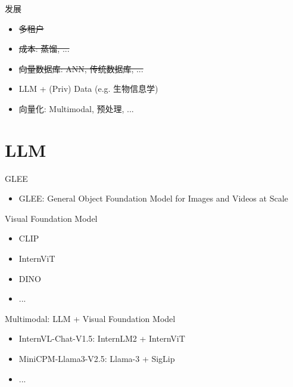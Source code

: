\documentclass{beamer}
\begin{document}
\begin{frame}{发展}
    \begin{itemize}
        \item \sout{多租户}
        \item \sout{成本: 蒸馏, ...}
        \item \sout{向量数据库: ANN, 传统数据库, ...}
        \item LLM + (Priv) Data (e.g. 生物信息学)
        \item 向量化: Multimodal, 预处理, ...
    \end{itemize}
\end{frame}

\section{LLM}

\begin{frame}{GLEE}
    \begin{itemize}
        \item GLEE: General Object Foundation Model for Images and Videos at Scale
    \end{itemize}
\end{frame}

\begin{frame}{Visual Foundation Model}
    \begin{itemize}
        \item CLIP
        \item InternViT
        \item DINO
        \item ...
    \end{itemize}
\end{frame}

\begin{frame}{Multimodal: LLM + Visual Foundation Model}
    \begin{itemize}
        \item InternVL-Chat-V1.5: InternLM2	+ InternViT
        \item MiniCPM-Llama3-V2.5: Llama-3 + SigLip
        \item ...
    \end{itemize}
\end{frame}
\end{document}
